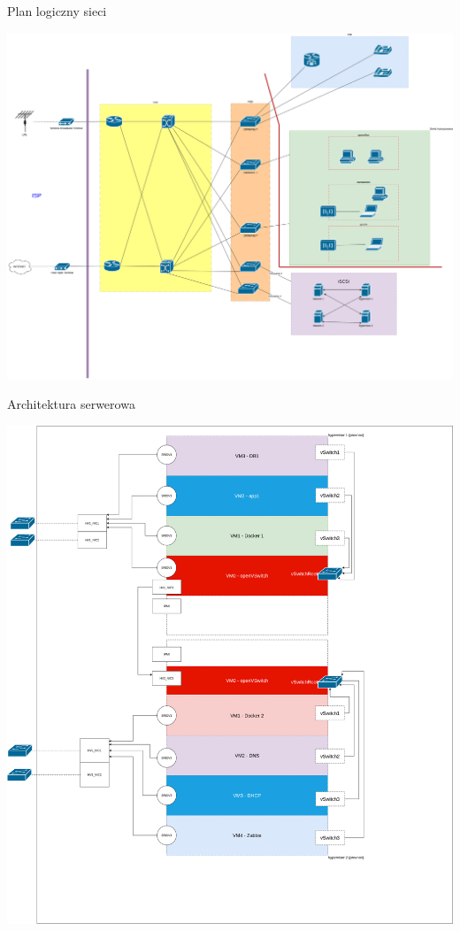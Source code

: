 \documentclass[presentation]{beamer}
\begin{document}
\begin{frame}[label={sec:org67fce53}]{Plan logiczny sieci}
\begin{center}
\includegraphics[width=.9\linewidth]{./data/siec/network_diagram_clean.png}
\end{center}
\end{frame}
\begin{frame}[label={sec:orgb16c778}]{Architektura serwerowa}
\begin{center}
\includegraphics[width=.9\linewidth]{./data/siec/server_diagram.png}
\end{center}
\end{frame}
\end{document}
